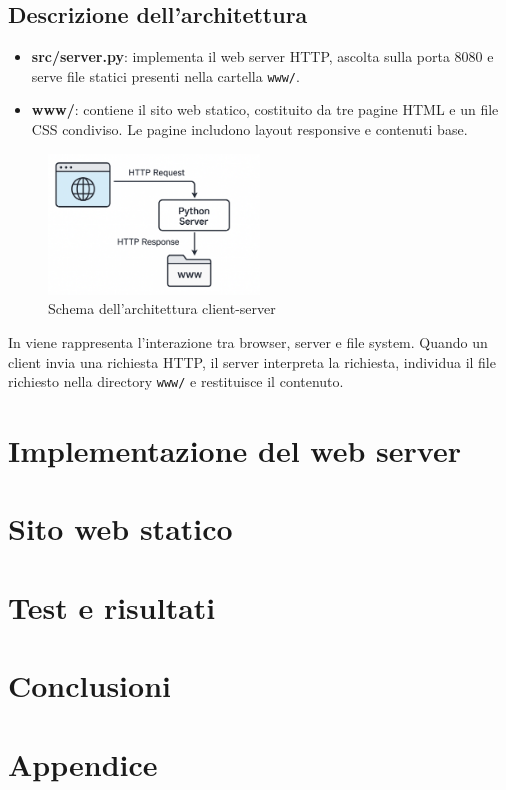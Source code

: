 \documentclass[a4paper,12pt]{report}
\begin{document}
\section{Descrizione dell'architettura}
\begin{itemize}
    \item \textbf{src/server.py}: implementa il web server HTTP, ascolta sulla porta 8080 e serve file
          statici presenti nella cartella \texttt{www/}.
    \item \textbf{www/}: contiene il sito web statico, costituito da tre pagine HTML e un file CSS
          condiviso. Le pagine includono layout responsive e contenuti base.
\end{itemize}

\begin{figure}[H]
    \centering
    \includegraphics[width=0.5\textwidth]{img/architettura.png}
    \caption{Schema dell'architettura client-server}
    \label{fig:architettura}
\end{figure}

In  viene rappresenta l'interazione tra browser, server e file system. Quando un client
invia una richiesta HTTP, il server interpreta la richiesta, individua il file richiesto nella directory \texttt{www/}
e restituisce il contenuto.

\chapter{Implementazione del web server}


\chapter{Sito web statico}

\chapter{Test e risultati}

\chapter{Conclusioni}

\chapter{Appendice}
\end{document}
